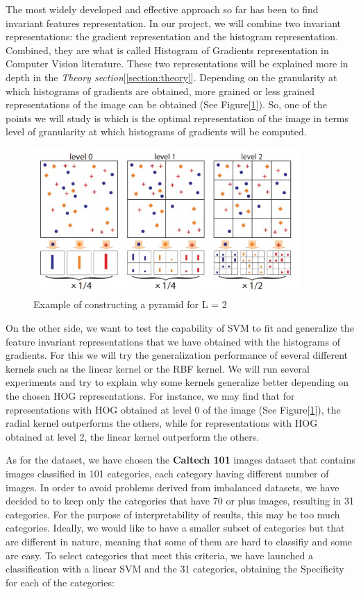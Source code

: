 The most widely developed and effective approach so far has been to find invariant features representation. In our project, we will combine two invariant representations: the gradient representation and the histogram representation. Combined, they are what is called Histogram of Gradients representation in Computer Vision literature. These two representations will be explained more in depth in the \textit{Theory section}[\ref{section:theory}]. Depending on the granularity at which histograms of gradients are obtained, more grained or less grained representations of the image can be obtained (See Figure[\ref{fig:hog_levels}]). So, one of the points we will study is which is the optimal representation of the image in terms level of granularity at which histograms of gradients will be computed. 

\begin{figure}[!h]
    \centering
    \includegraphics[width=0.9\textwidth]{Images/hog_levels.jpg}
    \caption{Example of constructing a pyramid for L = 2}
    \label{fig:hog_levels}
\end{figure}

On the other side, we want to test the capability of SVM to fit and generalize the feature invariant representations that we have obtained with the histograms of gradients. For this we will try the generalization performance of several different kernels such as the linear kernel or the RBF kernel. We will run several experiments and try to explain why some kernels generalize better depending on the chosen HOG representations. For instance, we may find that for representations with HOG obtained at level 0 of the image (See Figure[\ref{fig:hog_levels}]), the radial kernel outperforms the others, while for representations with HOG obtained at level 2, the linear kernel outperform the others.

As for the dataset, we have chosen the \textbf{Caltech 101} images dataset that contains images classified in 101 categories, each category having different number of images. In order to avoid problems derived from imbalanced datasets, we have decided to to keep only the categories that have 70 or plus images, resulting in 31 categories. For the purpose of interpretability of results, this may be too much categories. Ideally, we would like to have a smaller subset of categories but that are different in nature, meaning that some of them are hard to classifiy and some are easy. To select categories that meet this criteria, we have launched a classification with a linear SVM and the 31 categories, obtaining the Specificity for each of the categories:

